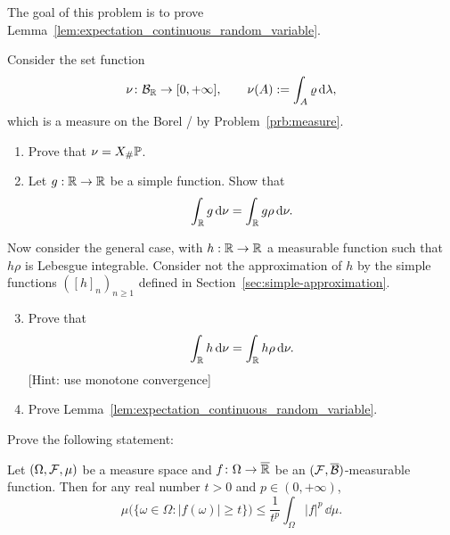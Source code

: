 \begin{problem}\label{prb:expectation_continuous_random_variable}
The goal of this problem is to prove Lemma~\ref{lem:expectation_continuous_random_variable}. 

Consider the set function
\[
	\nu\colon \mathcal B_{\mathbb R} \to [0,+\infty],\qquad\nu(A) := \int_A \varrho\, \mathrm{d} \lambda,
\]
which is a measure on the Borel \sigalg/ by Problem~\ref{prb:measure}.
\begin{enumerate}[label=(\alph*)]
\item Prove that $\nu = X_\# \mathbb P$.
\item Let $g : \mathbb R \to \mathbb R$ be a simple function. Show that
\[
	\int_{\mathbb R} g \, \mathrm{d} \nu = \int_{\mathbb R} g \rho \, \mathrm{d} \nu.
\]
\end{enumerate}

Now consider the general case, with $h : \mathbb R \to \mathbb R$ a measurable function such that $h \rho$ is Lebesgue integrable. Consider not the approximation of $h$ by the simple functions $([h]_n)_{n \ge 1}$ defined in Section~\ref{sec:simple-approximation}.
\begin{enumerate}[label=(\alph*)]
\setcounter{enumi}{2}
\item Prove that 
\[
	\int_{\mathbb R} h \, \mathrm{d} \nu = \int_{\mathbb R} h \rho \, \mathrm{d} \nu.
\]
[Hint: use monotone convergence]
\item Prove Lemma~\ref{lem:expectation_continuous_random_variable}.
\end{enumerate}
\end{problem}

\begin{problem}
	Prove the following statement: 
	
	\smallskip
	Let $(\Omega,\mathcal F,\mu)$ be a measure space and $f\colon \Omega\to \overline{\mathbb R}$ be an $(\mathcal F,\overline{\mathcal B})$-measurable function. Then for any real number $t>0$ and $p\in(0,+\infty)$,
	\[
		\mu\bigl(\{\omega\in\Omega : |f(\omega)|\ge t\}\bigr) \le \frac{1}{t^p}\int_\Omega |f|^p\,\dd\mu.
	\]
\end{problem}

